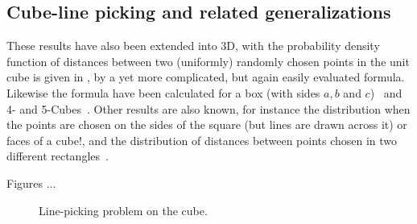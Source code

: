 \subsection{Cube-line picking and related generalizations}
\label{sec:cube_line}

These results have also been extended into 3D, with the probability
density function of distances between two (uniformly) randomly chosen
points in the unit cube is given in
\cite{mathai99:_distan,weisstein:_cube_line_picking}, by a yet more
complicated, but again easily evaluated formula. Likewise the formula
have been calculated for a box (with sides $a,b$ and
$c$)~\cite{philip:_probab_distr_distan_between_two} and 4- and
5-Cubes~\cite{philip:_probab_distr_distan_between_two_4d}. Other
results are also known, for instance the distribution when the points
are chosen on the sides of the square (but lines are drawn across it)
or faces of a cube!\cite{mathai99:_distan}, and the distribution of
distances between points chosen in two different
rectangles~\cite{b.ghosh51:_random_rect}.

Figures ...
 
\begin{figure}[tbp]
  \begin{center}
    \hspace{3mm}
    \caption{Line-picking problem on the cube.}
  \end{center} 
\vspace{-4mm}
\end{figure}

